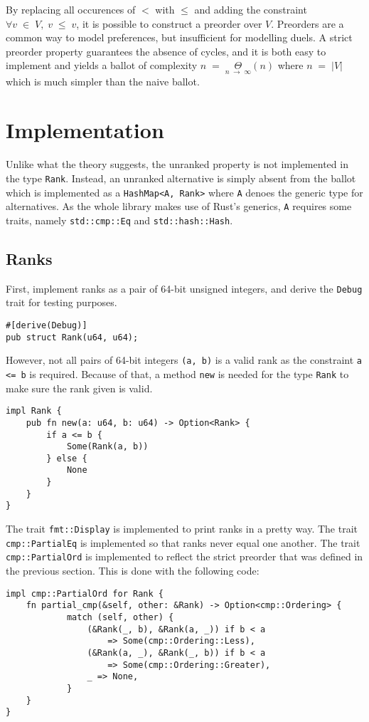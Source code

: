\documentclass{report}
\theoremstyle{definition}
\theoremstyle{plain}
\begin{document}
By replacing all occurences of $<$ with $\leqslant$ and adding the constraint
$\forall v\;\in\;V,\;v\;\leqslant\;v$, it is possible to construct a preorder
over $V$. Preorders are a common way to model preferences, but insufficient for
modelling duels. A strict preorder property guarantees the absence of cycles,
and it is both easy to implement and yields a ballot of complexity
$n\;=\;\underset{n\;\to\;\infty}\Theta\left(n\right)$ where
$n\;=\;\left|V\right|$ which is much simpler than the naive ballot.

\section{Implementation}
Unlike what the theory suggests, the unranked property is not implemented in
the type \verb!Rank!. Instead, an unranked alternative is simply absent from
the ballot which is implemented as a \verb!HashMap<A, Rank>! where \verb!A!
denoes the generic type for alternatives. As the whole library makes use of
Rust's generics, \verb!A! requires some traits, namely \verb!std::cmp::Eq! and
\verb!std::hash::Hash!.

\subsection{Ranks}
First, implement ranks as a pair of 64-bit unsigned integers, and derive the
\verb!Debug! trait for testing purposes.
\begin{lstlisting}
#[derive(Debug)]
pub struct Rank(u64, u64);
\end{lstlisting}
However, not all pairs of 64-bit integers \verb!(a, b)! is a valid rank as the
constraint \verb!a <= b! is required. Because of that, a method \verb!new! is
needed for the type \verb!Rank! to make sure the rank given is valid.
\begin{lstlisting}
impl Rank {
    pub fn new(a: u64, b: u64) -> Option<Rank> {
        if a <= b {
            Some(Rank(a, b))
        } else {
            None
        }
    }
}
\end{lstlisting}

The trait \verb!fmt::Display! is implemented to print ranks in a pretty way.
The trait \verb!cmp::PartialEq! is implemented so that ranks never equal one
another. The trait \verb!cmp::PartialOrd! is implemented to reflect the strict
preorder that was defined in the previous section. This is done with the
following code:
\begin{lstlisting}
impl cmp::PartialOrd for Rank {
    fn partial_cmp(&self, other: &Rank) -> Option<cmp::Ordering> {
            match (self, other) {
                (&Rank(_, b), &Rank(a, _)) if b < a
                    => Some(cmp::Ordering::Less),
                (&Rank(a, _), &Rank(_, b)) if b < a
                    => Some(cmp::Ordering::Greater),
                _ => None,
            }
    }
}
\end{lstlisting}
\end{document}
